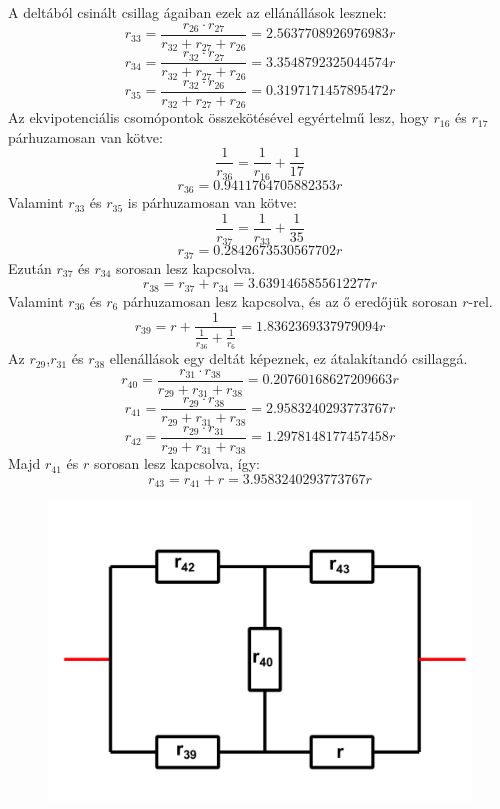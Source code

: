 \documentclass[11pt,a4paper,openany,leqno]{article}
\begin{document}
A deltából csinált csillag ágaiban ezek az ellánállások lesznek:\\
$$ r_{33} = \frac{r_{26} \cdot r_{27}}{r_{32} + r_{27} + r_{26}} = 2.5637708926976983r $$
$$ r_{34} = \frac{r_{32} \cdot r_{27}}{r_{32} + r_{27} + r_{26}} = 3.3548792325044574r $$
$$ r_{35} = \frac{r_{32} \cdot r_{26}}{r_{32} + r_{27} + r_{26}} = 0.3197171457895472r $$ \indent
Az ekvipotenciális csomópontok összekötésével egyértelmű lesz, hogy $r_{16}$ és $r_{17}$ párhuzamosan van kötve:\\
$$ \frac{1}{r_36} = \frac{1}{r_16} + \frac{1}{17} $$
$$ r_{36} = 0.9411764705882353r $$ \indent
Valamint $r_{33}$ és $r_{35}$ is párhuzamosan van kötve:\\
$$ \frac{1}{r_{37}} = \frac{1}{r_{33}} + \frac{1}{{35}} $$
$$ r_{{37}} = 0.2842673530567702r $$ \indent
Ezután $r_{{37}}$ és $r_{{34}}$ sorosan lesz kapcsolva.
$$ r_{{38}} = r_{{37}} + r_{{34}} = 3.6391465855612277r $$ \indent
Valamint $r_{36}$ és $r_6$ párhuzamosan lesz kapcsolva, és az ő eredőjük sorosan $r$-rel.
$$ r_{39} = r + \frac{1}{\frac{1}{r_{36}}+\frac{1}{r_6}} = 1.8362369337979094r $$ \indent
Az $r_{29}$,$r_{31}$ és $r_{38}$ ellenállások egy deltát képeznek, ez átalakítandó csillaggá.\\
$$ r_{40} = \frac{r_{31} \cdot r_{38}}{r_{29} + r_{31} + r_{38}} = 0.20760168627209663r $$
$$ r_{41} = \frac{r_{29} \cdot r_{38}}{r_{29} + r_{31} + r_{38}} = 2.9583240293773767r $$
$$ r_{42} = \frac{r_{29} \cdot r_{31}}{r_{29} + r_{31} + r_{38}} = 1.2978148177457458r $$ \indent
Majd $r_{41}$ és $r$ sorosan lesz kapcsolva, így:
$$ r_{43} = r_{41} + r = 3.9583240293773767r $$
\newpage
\begin{figure}[h!]
\centering
  \includegraphics[width=150mm,scale=0.5]{grid_3_11.pdf}
  \caption{}
  \label{}
\end{figure}
\indent
\end{document}
